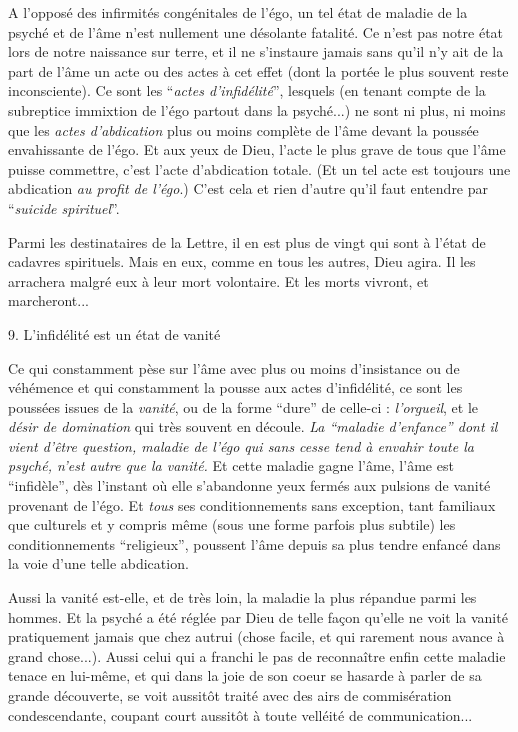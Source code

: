 
A l'opposé des infirmités congénitales de l'égo, un tel état de maladie de la psyché et de l'âme n'est nullement une désolante fatalité. Ce n'est pas notre état lors de notre naissance sur terre, et il ne s'instaure jamais sans qu'il n'y ait de la part de l'âme un acte ou des actes à cet effet (dont la portée le plus souvent reste inconsciente). Ce sont les ``\textit{actes d'infidélité}'', lesquels (en tenant compte de la subreptice immixtion de l'égo partout dans la psyché...) ne sont ni plus, ni moins que les \textit{actes d'abdication} plus ou moins complète de l'âme devant la poussée envahissante de l'égo. Et aux yeux de Dieu, l'acte le plus grave de tous que l'âme puisse commettre, c'est l'acte d'abdication totale. (Et un tel acte est toujours une abdication \textit{au profit de l'égo}.) C'est cela et rien d'autre qu'il faut entendre par ``\textit{suicide spirituel}''.

Parmi les destinataires de la Lettre, il en est plus de vingt qui sont à l'état de cadavres spirituels. Mais en eux, comme en tous les autres, Dieu agira. Il les arrachera malgré eux à leur mort volontaire. Et les morts vivront, et marcheront...

9. L'infidélité est un état de vanité

Ce qui constamment pèse sur l'âme avec plus ou moins d'insistance ou de véhémence et qui constamment la pousse aux actes d'infidélité, ce sont les poussées issues de la \textit{vanité}, ou de la forme ``dure'' de celle-ci : \textit{l'orgueil}, et le \textit{désir de domination} qui très souvent en découle. \textit{La ``maladie d'enfance'' dont il vient d'être question, maladie de l'égo qui sans cesse tend à envahir toute la psyché, n'est autre que la vanité.} Et cette maladie gagne l'âme, l'âme est ``infidèle'', dès l'instant où elle s'abandonne yeux fermés aux pulsions de vanité provenant de l'égo. Et \textit{tous} ses conditionnements sans exception, tant familiaux que culturels et y compris même (sous une forme parfois plus subtile) les conditionnements ``religieux'', poussent l'âme depuis sa plus tendre enfancé dans la voie d'une telle abdication.

Aussi la vanité est-elle, et de très loin, la maladie la plus répandue parmi les hommes. Et la psyché a été réglée par Dieu de telle façon qu'elle ne voit la vanité pratiquement jamais que chez autrui (chose facile, et qui rarement nous avance à grand chose...). Aussi celui qui a franchi le pas de reconnaître enfin cette maladie tenace en lui-même, et qui dans la joie de son coeur se hasarde à parler de sa grande découverte, se voit aussitôt traité avec des airs de commisération condescendante, coupant court aussitôt à toute velléité de communication...

